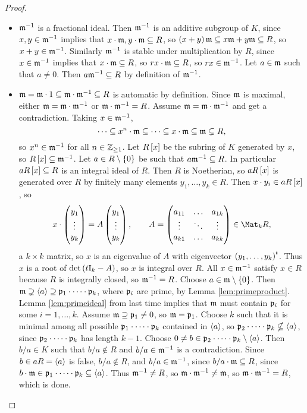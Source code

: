 \begin{proof}
\hfill
\begin{itemize}
\item $ \mathfrak{m}^{-1} $ is a fractional ideal. Then $ \mathfrak{m}^{-1} $ is an additive subgroup of $ K $, since $ x, y \in \mathfrak{m}^{-1} $ implies that $ x \cdot \mathfrak{m}, y \cdot \mathfrak{m} \subseteq R $, so $ \br{x + y}\mmm \subseteq x\mmm + y\mmm \subseteq R $, so $ x + y \in \mathfrak{m}^{-1} $. Similarly $ \mathfrak{m}^{-1} $ is stable under multiplication by $ R $, since $ x \in \mathfrak{m}^{-1} $ implies that $ x \cdot \mathfrak{m} \subseteq R $, so $ rx \cdot \mathfrak{m} \subseteq R $, so $ rx \in \mathfrak{m}^{-1} $. Let $ a \in \mathfrak{m} $ such that $ a \ne 0 $. Then $ a\mathfrak{m}^{-1} \subseteq R $ by definition of $ \mathfrak{m}^{-1} $.
\item $ \mathfrak{m} = \mathfrak{m} \cdot 1 \subseteq \mathfrak{m} \cdot \mathfrak{m}^{-1} \subseteq R $ is automatic by definition. Since $ \mathfrak{m} $ is maximal, either $ \mathfrak{m} = \mathfrak{m} \cdot \mathfrak{m}^{-1} $ or $ \mathfrak{m} \cdot \mathfrak{m}^{-1} = R $. Assume $ \mathfrak{m} = \mathfrak{m} \cdot \mathfrak{m}^{-1} $ and get a contradiction. Taking $ x \in \mathfrak{m}^{-1} $,
$$ \dots \subseteq x^n \cdot \mathfrak{m} \subseteq \dots \subseteq x \cdot \mathfrak{m} \subseteq \mathfrak{m} \subsetneq R, $$
so $ x^n \in \mathfrak{m}^{-1} $ for all $ n \in \mathbb{Z}_{\ge 1} $. Let $ R\sbr{x} $ be the subring of $ K $ generated by $ x $, so $ R\sbr{x} \subseteq \mmm^{-1} $. Let $ a \in R \setminus \cbr{0} $ be such that $ a\mathfrak{m}^{-1} \subseteq R $. In particular $ aR\sbr{x} \subseteq R $ is an integral ideal of $ R $. Then $ R $ is Noetherian, so $ aR\sbr{x} $ is generated over $ R $ by finitely many elements $ y_1, \dots, y_k \in R $. Then $ x \cdot y_i \in aR\sbr{x} $, so
$$ x \cdot \threebyone{y_1}{\vdots}{y_k} = A\threebyone{y_1}{\vdots}{y_k}, \qquad A = \threebythree{a_{11}}{\dots}{a_{1k}}{\vdots}{\ddots}{\vdots}{a_{k1}}{\dots}{a_{kk}} \in \Mat_k R, $$
a $ k \times k $ matrix, so $ x $ is an eigenvalue of $ A $ with eigenvector $ \br{y_1, \dots, y_k}^t $. Thus $ x $ is a root of $ \det \br{t\I_k - A} $, so $ x $ is integral over $ R $. All $ x \in \mathfrak{m}^{-1} $ satisfy $ x \in R $ because $ R $ is integrally closed, so $ \mathfrak{m}^{-1} = R $. Choose $ a \in \mmm \setminus \cbr{0} $. Then $ \mathfrak{m} \supsetneq \left\langle a \right\rangle \supseteq \mathfrak{p}_1 \cdot \dots \cdot \mathfrak{p}_k $, where $ \mathfrak{p}_i $ are prime, by Lemma \ref{lem:primeproduct}. Lemma \ref{lem:primeideal} from last time implies that $ \mathfrak{m} $ must contain $ \mathfrak{p}_i $ for some $ i = 1, \dots, k $. Assume $ \mathfrak{m} \supseteq \mathfrak{p}_1 \ne 0 $, so $ \mathfrak{m} = \mathfrak{p}_1 $. Choose $ k $ such that it is minimal among all possible $ \mathfrak{p}_1 \cdot \dots \cdot \mathfrak{p}_k $ contained in $ \left\langle a \right\rangle $, so $ \mathfrak{p}_2 \cdot \dots \cdot \mathfrak{p}_k \nsubseteq \left\langle a \right\rangle $, since $ \mathfrak{p}_2 \cdot \dots \cdot \mathfrak{p}_k $ has length $ k - 1 $. Choose $ 0 \ne b \in \mathfrak{p}_2 \cdot \dots \cdot \mathfrak{p}_k \setminus \left\langle a \right\rangle $. Then $ b / a \in K $ such that $ b / a \notin R $ and $ b / a \in \mathfrak{m}^{-1} $ is a contradiction. Since $ b \in aR = \left\langle a \right\rangle $ is false, $ b / a \notin R $, and $ b / a \in \mathfrak{m}^{-1} $, since $ b / a \cdot \mathfrak{m} \subseteq R $, since $ b \cdot \mathfrak{m} \in \mathfrak{p}_1 \cdot \dots \cdot \mathfrak{p}_k \subseteq \left\langle a \right\rangle $. Thus $ \mathfrak{m}^{-1} \ne R $, so $ \mathfrak{m} \cdot \mathfrak{m}^{-1} \ne \mathfrak{m} $, so $ \mathfrak{m} \cdot \mathfrak{m}^{-1} = R $, which is done.
\end{itemize}
\end{proof}

